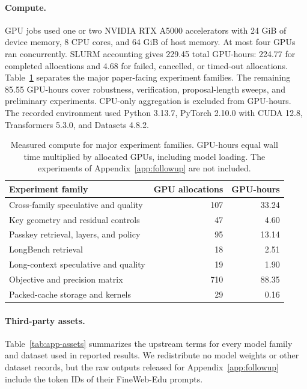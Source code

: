 \documentclass{article}
\begin{document}
\paragraph{Compute.}
GPU jobs used one or two NVIDIA RTX A5000 accelerators with 24 GiB of device
memory, 8 CPU cores, and 64 GiB of host memory. At most four GPUs ran
concurrently. SLURM accounting gives 229.45 total GPU-hours: 224.77 for
completed allocations and 4.68 for failed, cancelled, or timed-out
allocations. Table~\ref{tab:app-compute} separates the major paper-facing
experiment families. The remaining 85.55 GPU-hours cover robustness,
verification, proposal-length sweeps, and preliminary experiments. CPU-only
aggregation is excluded from GPU-hours. The recorded environment used Python
3.13.7, PyTorch 2.10.0 with CUDA 12.8, Transformers 5.3.0, and Datasets 4.8.2.

\begin{table}[ht]
  \centering
  \small
  \caption{Measured compute for major experiment families. GPU-hours equal
  wall time multiplied by allocated GPUs, including model loading. The
  experiments of Appendix~\ref{app:followup} are not included.}
  \label{tab:app-compute}
  \begin{tabular}{lrr}
    \toprule
    Experiment family & GPU allocations & GPU-hours \\
    \midrule
    Cross-family speculative and quality & 107 & 33.24 \\
    Key geometry and residual controls & 47 & 4.60 \\
    Passkey retrieval, layers, and policy & 95 & 13.14 \\
    LongBench retrieval & 18 & 2.51 \\
    Long-context speculative and quality & 19 & 1.90 \\
    Objective and precision matrix & 710 & 88.35 \\
    Packed-cache storage and kernels & 29 & 0.16 \\
    \bottomrule
  \end{tabular}
\end{table}

\paragraph{Third-party assets.}
Table~\ref{tab:app-assets} summarizes the upstream terms for every model family
and dataset used in reported results. We redistribute no model weights or other
dataset records, but the raw outputs released for Appendix~\ref{app:followup}
include the token IDs of their FineWeb-Edu prompts.
\end{document}
